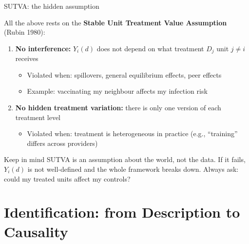 \documentclass[aspectratio=169, 10pt]{beamer}
\begin{document}

\begin{frame}{SUTVA: the hidden assumption}

  All the above rests on the \textbf{Stable Unit Treatment Value Assumption} (Rubin 1980):

  \bigskip
  \begin{enumerate}
    \item \textbf{No interference:} $Y_i(d)$ does not depend on what treatment $D_j$ unit $j \neq i$ receives
      \begin{itemize}
        \item Violated when: spillovers, general equilibrium effects, peer effects
        \item Example: vaccinating my neighbour affects my infection risk
      \end{itemize}
    \bigskip
    \item \textbf{No hidden treatment variation:} there is only one version of each treatment level
      \begin{itemize}
        \item Violated when: treatment is heterogeneous in practice (e.g., ``training'' differs across providers)
      \end{itemize}
  \end{enumerate}

  \bigskip
  \begin{alertblock}{Keep in mind}
    SUTVA is an assumption about the world, not the data. If it fails, $Y_i(d)$ is not well-defined and the whole framework breaks down. Always ask: could my treated units affect my controls?
  \end{alertblock}
\end{frame}

\section{Identification: from Description to Causality}
\end{document}

